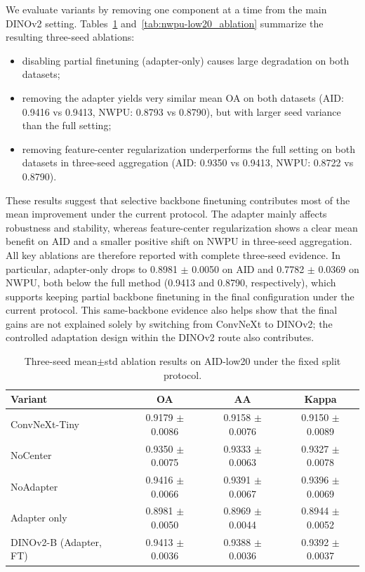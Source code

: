 \documentclass[a4paper,fleqn]{cas-sc}
\begin{document}
We evaluate variants by removing one component at a time from the main DINOv2 setting. Tables~\ref{tab:aid-low20_ablation} and~\ref{tab:nwpu-low20_ablation} summarize the resulting three-seed ablations:
\begin{itemize}[leftmargin=1.5em]
  \item disabling partial finetuning (adapter-only) causes large degradation on both datasets;
  \item removing the adapter yields very similar mean OA on both datasets (AID: 0.9416 vs 0.9413, NWPU: 0.8793 vs 0.8790), but with larger seed variance than the full setting;
  \item removing feature-center regularization underperforms the full setting on both datasets in three-seed aggregation (AID: 0.9350 vs 0.9413, NWPU: 0.8722 vs 0.8790).
\end{itemize}
These results suggest that selective backbone finetuning contributes most of the mean improvement under the current protocol. The adapter mainly affects robustness and stability, whereas feature-center regularization shows a clear mean benefit on AID and a smaller positive shift on NWPU in three-seed aggregation. All key ablations are therefore reported with complete three-seed evidence. In particular, adapter-only drops to 0.8981 $\pm$ 0.0050 on AID and 0.7782 $\pm$ 0.0369 on NWPU, both below the full method (0.9413 and 0.8790, respectively), which supports keeping partial backbone finetuning in the final configuration under the current protocol. This same-backbone evidence also helps show that the final gains are not explained solely by switching from ConvNeXt to DINOv2; the controlled adaptation design within the DINOv2 route also contributes.

\begin{table}
  \centering
  \caption{Three-seed mean$\pm$std ablation results on AID-low20 under the fixed split protocol.}
  \label{tab:aid-low20_ablation}
  \begin{tabular}{l c c c}
    \toprule
    Variant & OA & AA & Kappa \\
    \midrule
    ConvNeXt-Tiny & 0.9179 $\pm$ 0.0086 & 0.9158 $\pm$ 0.0076 & 0.9150 $\pm$ 0.0089 \\
    NoCenter & 0.9350 $\pm$ 0.0075 & 0.9333 $\pm$ 0.0063 & 0.9327 $\pm$ 0.0078 \\
    NoAdapter & 0.9416 $\pm$ 0.0066 & 0.9391 $\pm$ 0.0067 & 0.9396 $\pm$ 0.0069 \\
    Adapter only & 0.8981 $\pm$ 0.0050 & 0.8969 $\pm$ 0.0044 & 0.8944 $\pm$ 0.0052 \\
    DINOv2-B (Adapter, FT) & 0.9413 $\pm$ 0.0036 & 0.9388 $\pm$ 0.0036 & 0.9392 $\pm$ 0.0037 \\
    \bottomrule
  \end{tabular}
\end{table}
\end{document}
